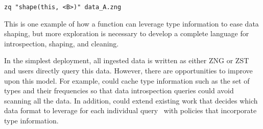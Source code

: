 \texttt{zq "shape(this, <B>)" data\_A.zng}

\noindent{}This is one example of how a function can leverage type information to ease data shaping, but more exploration is necessary to develop a complete language for introspection, shaping, and cleaning.

 In the simplest \sys{} deployment, all ingested data is written as either ZNG or ZST and users directly query this data. However, there are opportunities to improve upon this model. For example, \sys{} could cache type information such as the set of types and their frequencies so that data introspection queries could avoid scanning all the data. In addition, \sys{} could extend existing work that decides which data format to leverage for each individual query~\cite{octopusdb, h2o,peloton,tidb,one_size_fits_all_2007} with policies that incorporate type information.



